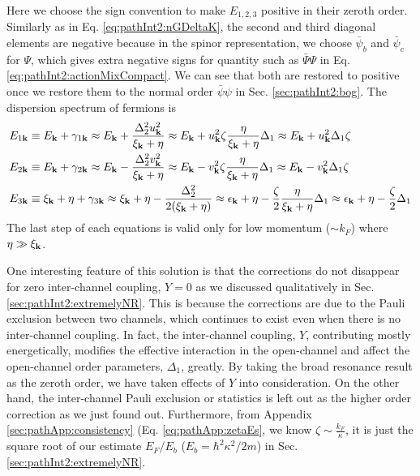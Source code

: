 Here we choose the sign convention to make  $E_{1,2,3}$  positive in their zeroth order.  Similarly as in Eq.  \ref{eq:pathInt2:nGDeltaK}, the second and third diagonal elements are negative because in the spinor representation, we choose $\bar{\psi}_{b}$ and $\bar{\psi}_{c}$ for $\Psi$, which gives extra negative signs for quantity such as $\bar\Psi\Psi$ in Eq. \ref{eq:pathInt2:actionMixCompact}.  We can see that both are restored to positive once we restore them to the normal order $\bar\psi\psi$ in Sec. \ref{sec:pathInt2:bog}.  %
The dispersion spectrum of fermions is
\begin{align}\label{eq:pathInt2:xiExpand}
E_{1\mathbf{k}}&\equiv{}E_{\mathbf{k}}+\gamma_{1\mathbf{k}}\approx{}E_{\mathbf{k}}+\frac{\Delta_{2}^{2}u_{\mathbf{k}}^{2}}{\xi_{\mathbf{k}}+\eta}
\approx{}E_{\mathbf{k}}+u_{\mathbf{k}}^{2}\zeta\frac{\eta}{\xi_{\mathbf{k}}+\eta}\Delta_{1}
\approx{}E_{\mathbf{k}}+u_{\mathbf{k}}^{2}\Delta_{1}\zeta\\
E_{2\mathbf{k}}&\equiv{}E_{\mathbf{k}}+\gamma_{2\mathbf{k}}\approx{}E_{\mathbf{k}}-\frac{\Delta_{2}^{2}v_{\mathbf{k}}^{2}}{\xi_{\mathbf{k}}+\eta}
\approx{}E_{\mathbf{k}}-v_{\mathbf{k}}^{2}\zeta\frac{\eta}{\xi_{\mathbf{k}}+\eta}\Delta_{1}
\approx{}E_{\mathbf{k}}-v_{\mathbf{k}}^{2}\Delta_{1}\zeta\label{eq:pathInt2:xiExpand2}\\
E_{3\mathbf{k}}&\equiv{}\xi_{\mathbf{k}}+\eta+\gamma_{3\mathbf{k}}\approx{}\xi_{\mathbf{k}}+\eta-\frac{\Delta_{2}^{2}}{2(\xi_{\mathbf{k}}+\eta)}
\approx{}\epsilon_{\mathbf{k}}+\eta-\frac{\zeta}{2}\frac{\eta}{\xi_{\mathbf{k}}+\eta}\Delta_{1}
\approx{}\epsilon_{\mathbf{k}}+\eta-\frac{\zeta}{2}\Delta_{1}
\label{eq:pathInt2:xiExpand3}
\end{align}
The last step of each equations is valid only for low momentum ($\sim{k_{F}}$) where $\eta\gg\xi_{\mathbf{k}}$. 

One interesting  feature of this solution  is that the corrections do not disappear for zero inter-channel coupling, $Y=0$ as we discussed qualitatively in Sec. \ref{sec:pathInt2:extremelyNR}.     This is because the corrections are due to the Pauli exclusion between two channels, which continues to exist even when there is no inter-channel coupling.  In fact, the inter-channel coupling, $Y$, contributing mostly energetically, modifies the effective interaction in the open-channel and affect the open-channel order parameters,  $\Delta_{1}$, greatly.  By taking the broad resonance result as the zeroth order, we have taken effects of $Y$ into consideration.  On the other hand, the inter-channel Pauli exclusion or statistics is left out as the higher order correction as we just found out. Furthermore, from Appendix \ref{sec:pathApp:consistency} (Eq. \ref{eq:pathApp:zetaEs}, we know $\zeta\sim\frac{k_F}{\kappa}$, it is just the square root of our estimate  $E_F/E_b$ ($E_b=\hbar^2\kappa^2/2m$) in Sec. \ref{sec:pathInt2:extremelyNR}.


